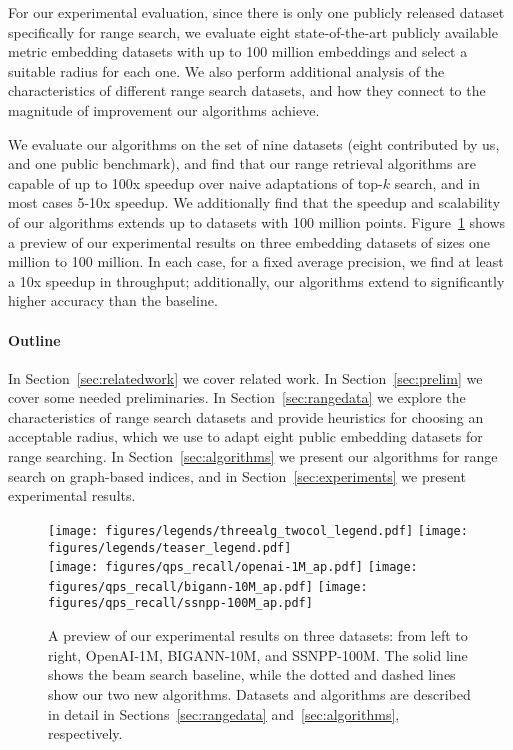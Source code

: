 For our experimental evaluation, since there is only one publicly released dataset specifically for range search, we evaluate eight state-of-the-art publicly available metric embedding datasets with up to 100 million embeddings and select a suitable radius for each one. We also perform additional analysis of the characteristics of different range search datasets, and how they connect to the magnitude of improvement our algorithms achieve.

We evaluate our algorithms on the set of nine datasets (eight contributed by us, and one public benchmark), and find that our range retrieval algorithms are capable of up to 100x speedup over naive adaptations of top-$k$ search, and in most cases 5-10x speedup. We additionally find that the speedup and scalability of our algorithms extends up to datasets with 100 million points.  Figure~\ref{fig:teaser} shows a preview of our experimental results on three embedding datasets of sizes one million to 100 million. In each case, for a fixed average precision, we find at least a 10x speedup in throughput; additionally, our algorithms extend to significantly higher accuracy than the baseline.

\paragraph{Outline} In Section~\ref{sec:relatedwork} we cover related work. In Section~\ref{sec:prelim} we cover some needed preliminaries. In Section~\ref{sec:rangedata} we explore the characteristics of range search datasets and provide heuristics for choosing an acceptable radius, which we use to adapt eight public embedding datasets for range searching. In Section~\ref{sec:algorithms} we present our algorithms for range search on graph-based indices, and in Section~\ref{sec:experiments} we present experimental results.

\begin{figure}
	\texttt{[image: figures/legends/threealg\_twocol\_legend.pdf]} 
	\texttt{[image: figures/legends/teaser\_legend.pdf]} \\
	\texttt{[image: figures/qps\_recall/openai-1M\_ap.pdf]}
	\texttt{[image: figures/qps\_recall/bigann-10M\_ap.pdf]}
	\texttt{[image: figures/qps\_recall/ssnpp-100M\_ap.pdf]} \\
	\caption{A preview of our experimental results on three datasets: from left to right, OpenAI-1M, BIGANN-10M, and SSNPP-100M. The solid line shows the beam search baseline, while the dotted and dashed lines show our two new algorithms. Datasets and algorithms are described in detail in Sections~\ref{sec:rangedata} and~\ref{sec:algorithms}, respectively.}
	\label{fig:teaser}
\end{figure}

